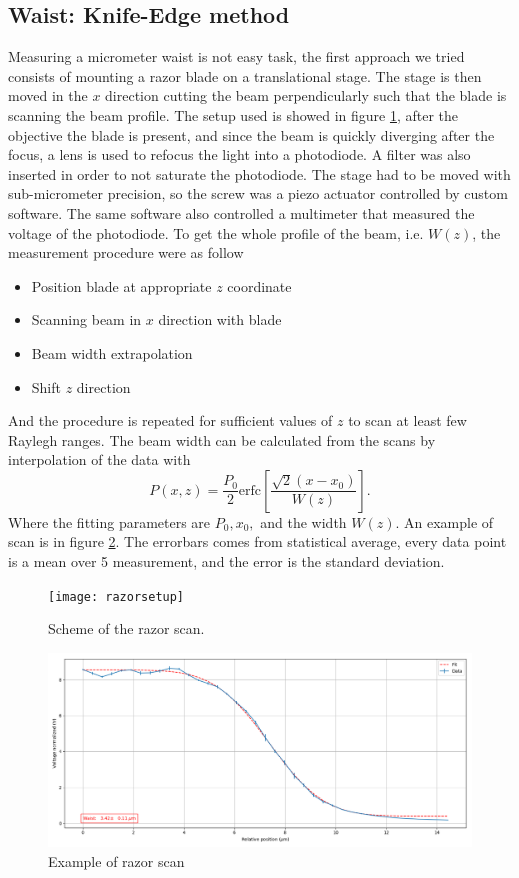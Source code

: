 \subsection{Waist: Knife-Edge method}
Measuring a micrometer waist is not easy task, the first approach we tried consists of mounting a razor blade on a translational stage. The stage is then moved in the $x$ direction cutting the beam perpendicularly such that the blade is scanning the beam profile. The setup used is showed in figure \ref{razorscan}, after the objective the blade is present, and since the beam is quickly diverging after the focus, a lens is used to refocus the light into a photodiode. A filter was also inserted in order to not saturate the photodiode.
The stage had to be moved with sub-micrometer precision, so the screw was a piezo actuator controlled by custom software. The same software also controlled a multimeter that measured the voltage of the photodiode. To get the whole profile of the beam, i.e. $W(z)$, the measurement procedure were as follow
\begin{itemize}
\item Position blade at appropriate $z$ coordinate
\item Scanning beam in $x$ direction with blade
\item Beam width extrapolation
\item Shift $z$ direction
\end{itemize}
And the procedure is repeated for sufficient values of $z$ to scan at least few Raylegh ranges. The beam width can be calculated from the scans by interpolation of the data with \cite{knifeedge}
\begin{equation}
P(x,z) = \frac{P_0}{2}\text{erfc}\left[\frac{\sqrt{2}(x-x_0)}{W(z)} \right].
\end{equation}
Where the fitting parameters are $P_0,x_0,$ and the width $W(z)$. An example of scan is in figure \ref{examplerazorscan}. The errorbars comes from statistical average, every data point is a mean over 5 measurement, and the error is the standard deviation.

\begin{figure}
\centering
\texttt{[image: razorsetup]}
\caption{Scheme of the razor scan.}
\label{razorscan}
\end{figure}


\begin{figure}
\centering
\includegraphics[width=\textwidth]{img/prova7}
\caption{Example of razor scan}
\label{examplerazorscan}
\end{figure}
